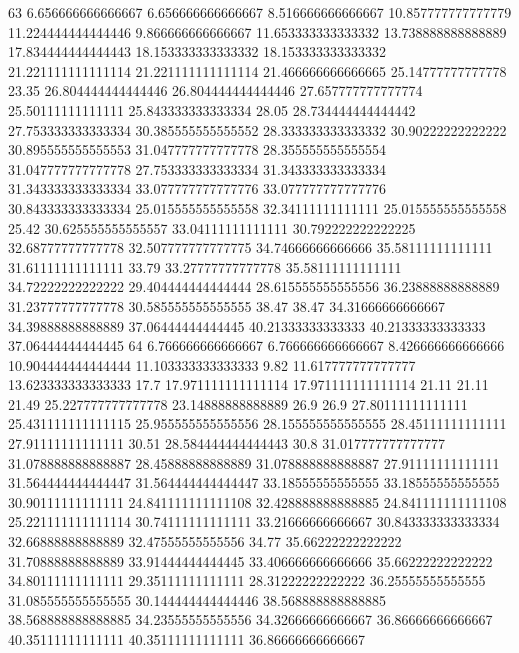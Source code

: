 63 6.656666666666667 6.656666666666667 8.516666666666667 10.857777777777779 11.224444444444446 9.866666666666667 11.653333333333332 13.738888888888889 17.834444444444443 18.153333333333332 18.153333333333332 21.221111111111114 21.221111111111114 21.466666666666665 25.14777777777778 23.35 26.804444444444446 26.804444444444446 27.657777777777774 25.50111111111111 25.843333333333334 28.05 28.734444444444442 27.753333333333334 30.385555555555552 28.333333333333332 30.90222222222222 30.895555555555553 31.047777777777778 28.355555555555554 31.047777777777778 27.753333333333334 31.343333333333334 31.343333333333334 33.077777777777776 33.077777777777776 30.843333333333334 25.015555555555558 32.34111111111111 25.015555555555558 25.42 30.625555555555557 33.04111111111111 30.792222222222225 32.68777777777778 32.507777777777775 34.74666666666666 35.58111111111111 31.61111111111111 33.79 33.27777777777778 35.58111111111111 34.72222222222222 29.404444444444444 28.615555555555556 36.23888888888889 31.23777777777778 30.585555555555555 38.47 38.47 34.31666666666667 34.39888888888889 37.06444444444445 40.21333333333333 40.21333333333333 37.06444444444445
64 6.766666666666667 6.766666666666667 8.426666666666666 10.904444444444444 11.103333333333333 9.82 11.617777777777777 13.623333333333333 17.7 17.971111111111114 17.971111111111114 21.11 21.11 21.49 25.227777777777778 23.14888888888889 26.9 26.9 27.80111111111111 25.431111111111115 25.955555555555556 28.155555555555555 28.45111111111111 27.91111111111111 30.51 28.584444444444443 30.8 31.017777777777777 31.078888888888887 28.45888888888889 31.078888888888887 27.91111111111111 31.564444444444447 31.564444444444447 33.18555555555555 33.18555555555555 30.90111111111111 24.841111111111108 32.428888888888885 24.841111111111108 25.221111111111114 30.74111111111111 33.21666666666667 30.843333333333334 32.66888888888889 32.47555555555556 34.77 35.66222222222222 31.70888888888889 33.91444444444445 33.406666666666666 35.66222222222222 34.80111111111111 29.35111111111111 28.31222222222222 36.25555555555555 31.085555555555555 30.144444444444446 38.568888888888885 38.568888888888885 34.23555555555556 34.32666666666667 36.86666666666667 40.35111111111111 40.35111111111111 36.86666666666667
